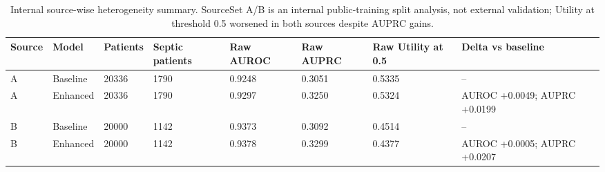 \begin{table}[!t]
\centering
\caption{Internal source-wise heterogeneity summary. SourceSet A/B is an internal public-training split analysis, not external validation; Utility at threshold 0.5 worsened in both sources despite AUPRC gains.}
\label{tab:phase8_phase4_sourcewise}
\footnotesize
\renewcommand{\arraystretch}{1.12}
\begin{tabular*}{\textwidth}{@{\extracolsep{\fill}}llllllll}
\toprule
\textbf{Source} & \textbf{Model} & \textbf{Patients} & \textbf{Septic patients} & \textbf{Raw AUROC} & \textbf{Raw AUPRC} & \textbf{Raw Utility at 0.5} & \textbf{Delta vs baseline} \\
\midrule
A & Baseline & 20336 & 1790 & 0.9248 & 0.3051 & 0.5335 & -- \\
A & Enhanced & 20336 & 1790 & 0.9297 & 0.3250 & 0.5324 & AUROC +0.0049; AUPRC +0.0199 \\
B & Baseline & 20000 & 1142 & 0.9373 & 0.3092 & 0.4514 & -- \\
B & Enhanced & 20000 & 1142 & 0.9378 & 0.3299 & 0.4377 & AUROC +0.0005; AUPRC +0.0207 \\
\bottomrule
\end{tabular*}
\end{table}
